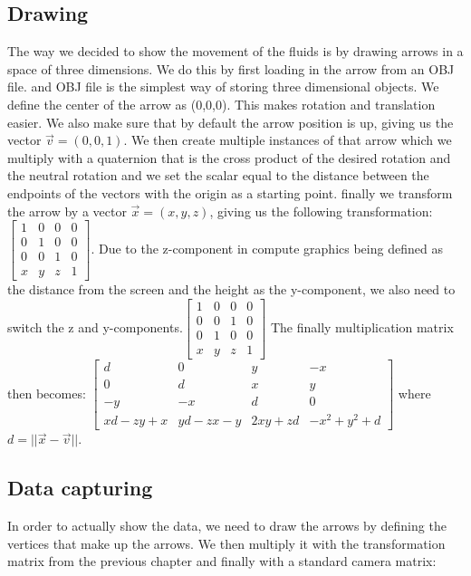 \documentclass{article}
\begin{document}
\subsection{Drawing}
The way we decided to show the movement of the fluids is by drawing arrows in a space of three dimensions. We do this by first loading in the arrow from an OBJ file. and OBJ file is the simplest way of storing three dimensional objects. We define the center of the arrow as (0,0,0). This makes rotation and translation easier. We also make sure that by default the arrow position is up, giving us the vector $\vec{v}=(0,0,1)$. We then create multiple instances of that arrow which we multiply with a quaternion that is the cross product of the desired rotation and the neutral rotation and we set the scalar equal to the distance between the endpoints of the vectors with the origin as a starting point. finally we transform the arrow by a vector $\vec{x}=(x,y,z)$, giving us the following transformation: 
$\begin{bmatrix}
1 & 0 & 0 & 0\\
0 & 1 & 0 & 0\\
0 & 0 & 1 & 0\\
x & y & z & 1
\end{bmatrix}$. Due to the z-component in compute graphics being defined as the distance from the screen and the height as the y-component, we also need to switch the z and y-components.$\begin{bmatrix}
1 & 0 & 0 & 0\\
0 & 0 & 1 & 0\\
0 & 1 & 0 & 0\\
x & y & z & 1
\end{bmatrix}$
The finally multiplication matrix then becomes: 
$\begin{bmatrix}

d & 0 & y & -x\\
0 & d & x & y\\
-y & -x & d & 0\\
xd-zy+x & yd -zx - y & 2xy + zd & -x^2 + y^2 + d 

\end{bmatrix}$
where $d = ||\vec{x}-\vec{v}||$.\cite{Quaternion rotation}
\subsection{Data capturing}
In order to actually show the data, we need to draw the arrows by defining the vertices that make up the arrows. We then multiply it with the transformation matrix from the previous chapter and finally with a standard camera matrix: 
\end{document}
